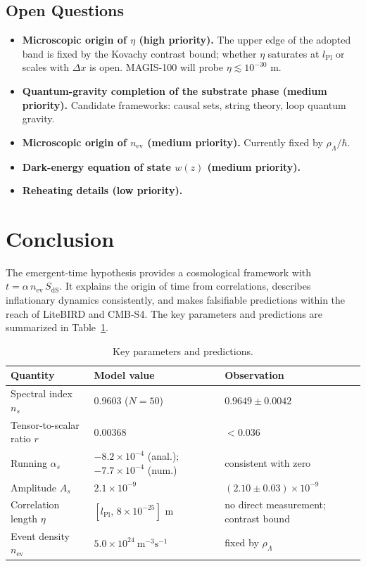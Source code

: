 \documentclass[11pt,a4paper]{article}
\begin{document}
\subsection{Open Questions}\label{sec:open}
\begin{itemize}
\item \textbf{Microscopic origin of $\eta$ (high priority).} The
      upper edge of the adopted band is fixed by the Kovachy
      contrast bound; whether $\eta$ saturates at $l_{\mathrm{Pl}}$
      or scales with $\Delta x$ is open. MAGIS-100 will probe
      $\eta\lesssim10^{-30}$ m.
\item \textbf{Quantum-gravity completion of the substrate phase
      (medium priority).} Candidate frameworks: causal sets, string
      theory, loop quantum gravity.
\item \textbf{Microscopic origin of $n_{\mathrm{ev}}$ (medium
      priority).} Currently fixed by $\rho_{\Lambda}/\hbar$.
\item \textbf{Dark-energy equation of state $w(z)$ (medium
      priority).}
\item \textbf{Reheating details (low priority).}
\end{itemize}

\section{Conclusion}
The emergent-time hypothesis provides a cosmological framework with
$t=\alpha\, n_{\mathrm{ev}}\, S_{\mathrm{dS}}$. It explains the
origin of time from correlations, describes inflationary dynamics
consistently, and makes falsifiable predictions within the reach of
LiteBIRD and CMB-S4. The key parameters and predictions are
summarized in Table~\ref{tab:summary}.

\begin{table}[h]
\centering
\caption{Key parameters and predictions.}
\label{tab:summary}
\begin{tabular}{lll}
\toprule
Quantity & Model value & Observation\\
\midrule
Spectral index $n_{s}$ & 0.9603 ($N=50$) & $0.9649\pm0.0042$ \cite{Planck2018}\\
Tensor-to-scalar ratio $r$ & 0.00368 & $<0.036$ \cite{BICEPKeck}\\
Running $\alpha_{s}$ & $-8.2\times10^{-4}$ (anal.); $-7.7\times10^{-4}$ (num.)
& consistent with zero\\
Amplitude $A_{s}$ & $2.1\times10^{-9}$ & $(2.10\pm0.03)\times10^{-9}$ \cite{Planck2018}\\
Correlation length $\eta$ & $[l_{\mathrm{Pl}},\,8\times10^{-25}]$ m
& no direct measurement; contrast bound\\
Event density $n_{\mathrm{ev}}$ & $5.0\times10^{24}\ \mathrm{m^{-3}s^{-1}}$
& fixed by $\rho_{\Lambda}$\\
\bottomrule
\end{tabular}
\end{table}
\end{document}
